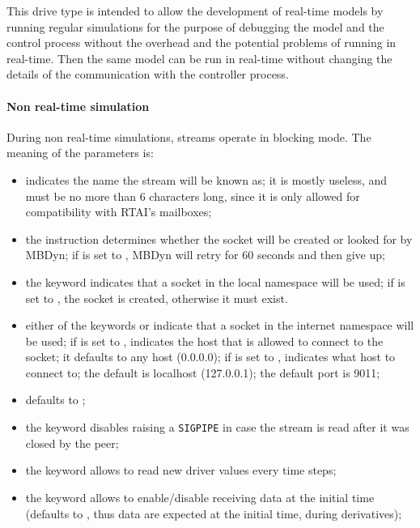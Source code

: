 This drive type is intended to allow the development of real-time models
by running regular simulations for the purpose of debugging the model
and the control process without the overhead and the potential problems
of running in real-time.
Then the same model can be run in real-time without changing the details
of the communication with the controller process.

\paragraph{Non real-time simulation}
During non real-time simulations, streams operate in blocking mode.
The meaning of the parameters is:
\begin{itemize}
\item {} indicates the name the stream will be known as;
it is mostly useless, and must be no more than 6 characters long,
since it is only allowed for compatibility with RTAI's mailboxes;

\item the instruction  determines whether the socket will be
created or looked for by MBDyn; if  is set to ,
MBDyn will retry for 60 seconds and then give up;

\item the keyword  indicates that a socket 
in the local namespace will be used; if  is set to ,
the socket is created, otherwise it must exist.

\item either of the keywords  or  indicate that a socket
in the internet namespace will be used;
if  is set to ,  indicates 
the host that is allowed to connect to the socket; it defaults 
to any host (0.0.0.0); if  is set to ,
 indicates what host to connect to; the default 
is localhost (127.0.0.1); the default port is 9011;

\item {} defaults to ;

\item the keyword  disables raising a \texttt{SIGPIPE}
in case the stream is read after it was closed by the peer;

\item the keyword  allows to read new driver values
every  time steps;

\item the keyword  allows to enable/disable
receiving data at the initial time (defaults to ,
thus data are expected at the initial time, during derivatives);


\end{itemize}
